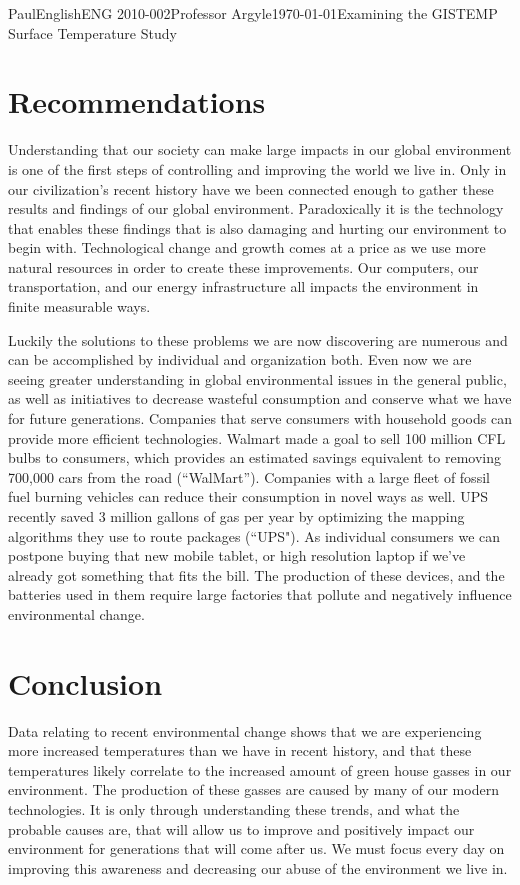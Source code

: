 \documentclass[12pt,letterpaper]{article}
\begin{document}
\begin{mla}{Paul}{English}{ENG 2010-002}{Professor Argyle}{\today}{Examining the GISTEMP Surface Temperature Study}
\section{Recommendations}

Understanding that our society can make large impacts in our global environment is one of the first steps of controlling and improving the world we live in. Only in our civilization's recent history have we been connected enough to gather these results and findings of our global environment. Paradoxically it is the technology that enables these findings that is also damaging and hurting our environment to begin with. Technological change and growth comes at a price as we use more natural resources in order to create these improvements. Our computers, our transportation, and our energy infrastructure all impacts the environment in finite measurable ways.

Luckily the solutions to these problems we are now discovering are numerous and can be accomplished by individual and organization both. Even now we are seeing greater understanding in global environmental issues in the general public, as well as initiatives to decrease wasteful consumption and conserve what we have for future generations. Companies that serve consumers with household goods can provide more efficient technologies. Walmart made a goal to sell 100 million CFL bulbs to consumers, which provides an estimated savings equivalent to removing 700,000 cars from the road (``WalMart''). Companies with a large fleet of fossil fuel burning vehicles can reduce their consumption in novel ways as well. UPS recently saved 3 million gallons of gas per year by optimizing the mapping algorithms they use to route packages (``UPS"). As individual consumers we can postpone buying that new mobile tablet, or high resolution laptop if we've already got something that fits the bill. The production of these devices, and the batteries used in them require large factories that pollute and negatively influence environmental change.

\section{Conclusion}
Data relating to recent environmental change shows that we are experiencing more increased temperatures than we have in recent history, and that these temperatures likely correlate to the increased amount of green house gasses in our environment. The production of these gasses are caused by many of our modern technologies. It is only through understanding these trends, and what the probable causes are, that will allow us to improve and positively impact our environment for generations that will come after us. We must focus every day on improving this awareness and decreasing our abuse of the environment we live in.


\end{mla}
\end{document}
